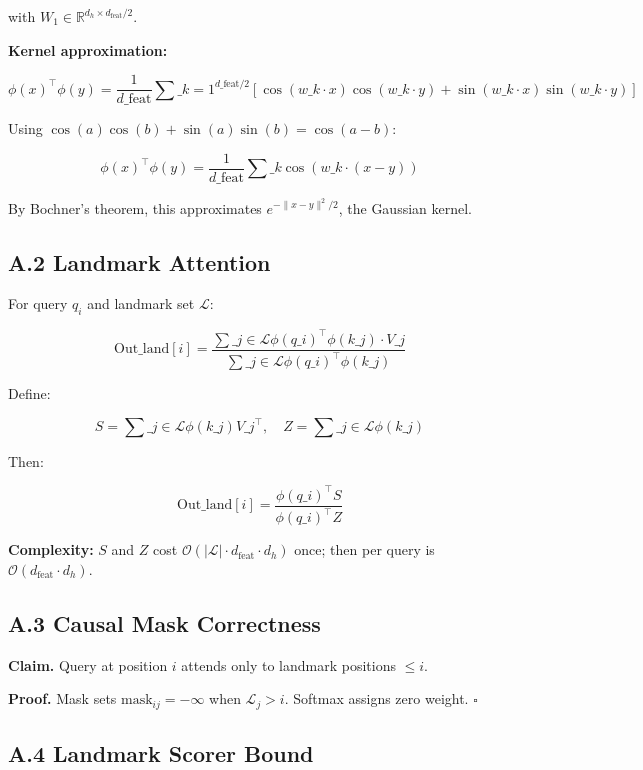with $W_1 \in \mathbb{R}^{d_h \times d_\text{feat}/2}$.

\textbf{Kernel approximation:}

\[
\phi(x)^\top \phi(y) = \frac{1}{d\_\text{feat}} \sum\_{k=1}^{d\_\text{feat}/2} [\cos(w\_k \cdot x) \cos(w\_k \cdot y) + \sin(w\_k \cdot x) \sin(w\_k \cdot y)]
\tag{A.2}
\]

Using $\cos(a)\cos(b) + \sin(a)\sin(b) = \cos(a - b)$:

\[
\phi(x)^\top \phi(y) = \frac{1}{d\_\text{feat}} \sum\_k \cos(w\_k \cdot (x - y))
\tag{A.3}
\]

By Bochner's theorem, this approximates $e^{-\|x-y\|^2/2}$, the Gaussian kernel.

\subsection{A.2 Landmark Attention}

For query $q_i$ and landmark set $\mathcal{L}$:

\[
\text{Out}\_\text{land}[i] = \frac{\sum\_{j \in \mathcal{L}} \phi(q\_i)^\top \phi(k\_j) \cdot V\_j}{\sum\_{j \in \mathcal{L}} \phi(q\_i)^\top \phi(k\_j)}
\tag{A.4}
\]

Define:

\[
S = \sum\_{j \in \mathcal{L}} \phi(k\_j) V\_j^\top, \quad Z = \sum\_{j \in \mathcal{L}} \phi(k\_j)
\tag{A.5}
\]

Then:

\[
\text{Out}\_\text{land}[i] = \frac{\phi(q\_i)^\top S}{\phi(q\_i)^\top Z}
\tag{A.6}
\]

\textbf{Complexity:} $S$ and $Z$ cost $\mathcal{O}(|\mathcal{L}| \cdot d_\text{feat} \cdot d_h)$ 
once; then per query is $\mathcal{O}(d_\text{feat} \cdot d_h)$.

\subsection{A.3 Causal Mask Correctness}

\textbf{Claim.} Query at position $i$ attends only to landmark positions $\leq i$.

\textbf{Proof.} Mask sets $\text{mask}_{ij} = -\infty$ when $\mathcal{L}_j > i$. 
Softmax assigns zero weight. $\square$

\subsection{A.4 Landmark Scorer Bound}

